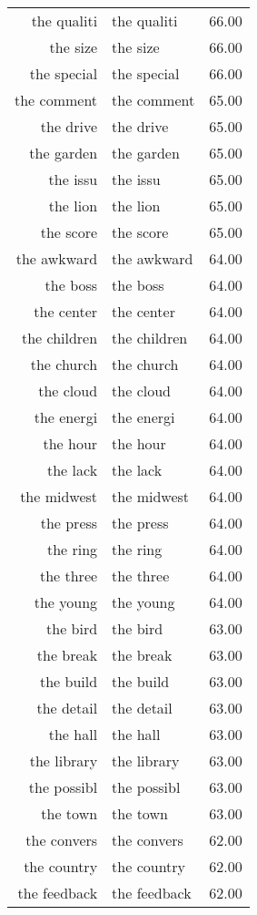 \begin{table}[ht]
\begin{tabular}{rlr}
  the qualiti & the qualiti & 66.00 \\ 
  the size & the size & 66.00 \\ 
  the special & the special & 66.00 \\ 
  the comment & the comment & 65.00 \\ 
  the drive & the drive & 65.00 \\ 
  the garden & the garden & 65.00 \\ 
  the issu & the issu & 65.00 \\ 
  the lion & the lion & 65.00 \\ 
  the score & the score & 65.00 \\ 
  the awkward & the awkward & 64.00 \\ 
  the boss & the boss & 64.00 \\ 
  the center & the center & 64.00 \\ 
  the children & the children & 64.00 \\ 
  the church & the church & 64.00 \\ 
  the cloud & the cloud & 64.00 \\ 
  the energi & the energi & 64.00 \\ 
  the hour & the hour & 64.00 \\ 
  the lack & the lack & 64.00 \\ 
  the midwest & the midwest & 64.00 \\ 
  the press & the press & 64.00 \\ 
  the ring & the ring & 64.00 \\ 
  the three & the three & 64.00 \\ 
  the young & the young & 64.00 \\ 
  the bird & the bird & 63.00 \\ 
  the break & the break & 63.00 \\ 
  the build & the build & 63.00 \\ 
  the detail & the detail & 63.00 \\ 
  the hall & the hall & 63.00 \\ 
  the library & the library & 63.00 \\ 
  the possibl & the possibl & 63.00 \\ 
  the town & the town & 63.00 \\ 
  the convers & the convers & 62.00 \\ 
  the country & the country & 62.00 \\ 
  the feedback & the feedback & 62.00 \\ 

\end{tabular}
\end{table}
